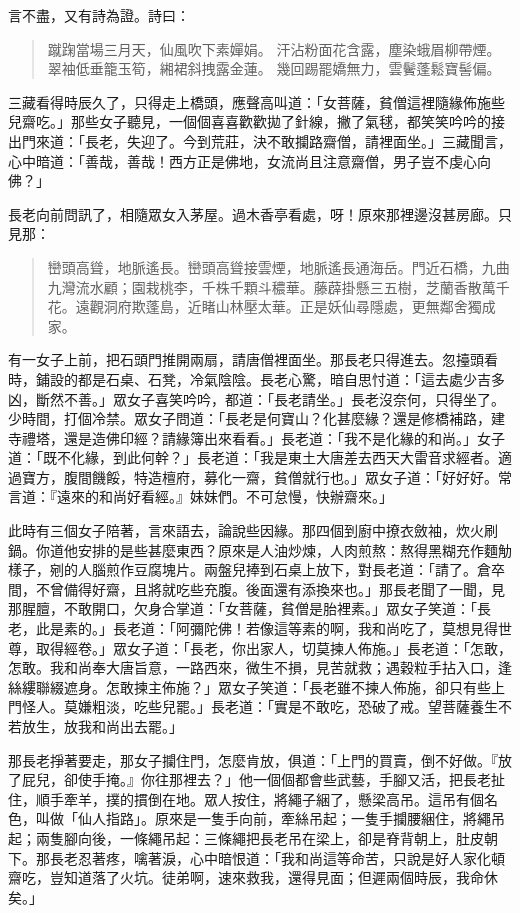 言不盡，又有詩為證。詩曰：
\begin{quote}
蹴踘當場三月天，仙風吹下素嬋娟。
汗沾粉面花含露，塵染蛾眉柳帶煙。
翠袖低垂籠玉筍，緗裙斜拽露金蓮。
幾回踢罷嬌無力，雲鬢蓬鬆寶髻偏。
\end{quote}

三藏看得時辰久了，只得走上橋頭，應聲高叫道：「女菩薩，貧僧這裡隨緣佈施些兒齋吃。」那些女子聽見，一個個喜喜歡歡拋了針線，撇了氣毬，都笑笑吟吟的接出門來道：「長老，失迎了。今到荒莊，決不敢攔路齋僧，請裡面坐。」三藏聞言，心中暗道：「善哉，善哉！西方正是佛地，女流尚且注意齋僧，男子豈不虔心向佛？」

長老向前問訊了，相隨眾女入茅屋。過木香亭看處，呀！原來那裡邊沒甚房廊。只見那：
\begin{quote}
巒頭高聳，地脈遙長。巒頭高聳接雲煙，地脈遙長通海岳。門近石橋，九曲九灣流水顧；園栽桃李，千株千顆斗穠華。藤薜掛懸三五樹，芝蘭香散萬千花。遠觀洞府欺蓬島，近睹山林壓太華。正是妖仙尋隱處，更無鄰舍獨成家。
\end{quote}

有一女子上前，把石頭門推開兩扇，請唐僧裡面坐。那長老只得進去。忽擡頭看時，鋪設的都是石桌、石凳，冷氣陰陰。長老心驚，暗自思忖道：「這去處少吉多凶，斷然不善。」眾女子喜笑吟吟，都道：「長老請坐。」長老沒奈何，只得坐了。少時間，打個冷禁。眾女子問道：「長老是何寶山？化甚麼緣？還是修橋補路，建寺禮塔，還是造佛印經？請緣簿出來看看。」長老道：「我不是化緣的和尚。」女子道：「既不化緣，到此何幹？」長老道：「我是東土大唐差去西天大雷音求經者。適過寶方，腹間饑餒，特造檀府，募化一齋，貧僧就行也。」眾女子道：「好好好。常言道：『遠來的和尚好看經。』妹妹們。不可怠慢，快辦齋來。」

此時有三個女子陪著，言來語去，論說些因緣。那四個到廚中撩衣斂袖，炊火刷鍋。你道他安排的是些甚麼東西？原來是人油炒煉，人肉煎熬：熬得黑糊充作麵觔樣子，剜的人腦煎作豆腐塊片。兩盤兒捧到石桌上放下，對長老道：「請了。倉卒間，不曾備得好齋，且將就吃些充腹。後面還有添換來也。」那長老聞了一聞，見那腥膻，不敢開口，欠身合掌道：「女菩薩，貧僧是胎裡素。」眾女子笑道：「長老，此是素的。」長老道：「阿彌陀佛！若像這等素的啊，我和尚吃了，莫想見得世尊，取得經卷。」眾女子道：「長老，你出家人，切莫揀人佈施。」長老道：「怎敢，怎敢。我和尚奉大唐旨意，一路西來，微生不損，見苦就救；遇穀粒手拈入口，逢絲縷聯綴遮身。怎敢揀主佈施？」眾女子笑道：「長老雖不揀人佈施，卻只有些上門怪人。莫嫌粗淡，吃些兒罷。」長老道：「實是不敢吃，恐破了戒。望菩薩養生不若放生，放我和尚出去罷。」

那長老掙著要走，那女子攔住門，怎麼肯放，俱道：「上門的買賣，倒不好做。『放了屁兒，卻使手掩。』你往那裡去？」他一個個都會些武藝，手腳又活，把長老扯住，順手牽羊，撲的摜倒在地。眾人按住，將繩子綑了，懸梁高吊。這吊有個名色，叫做「仙人指路」。原來是一隻手向前，牽絲吊起；一隻手攔腰綑住，將繩吊起；兩隻腳向後，一條繩吊起：三條繩把長老吊在梁上，卻是脊背朝上，肚皮朝下。那長老忍著疼，噙著淚，心中暗恨道：「我和尚這等命苦，只說是好人家化頓齋吃，豈知道落了火坑。徒弟啊，速來救我，還得見面；但遲兩個時辰，我命休矣。」

